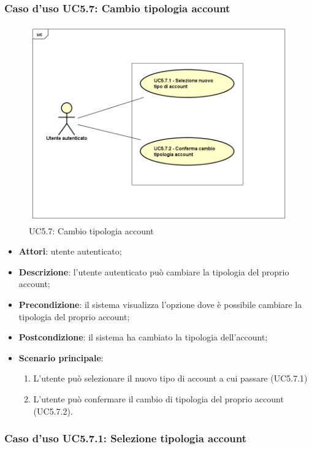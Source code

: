 \subsubsection{Caso d'uso UC5.7: Cambio tipologia account}
\label{UC5.7}
\begin{figure}[h]
	\centering
	\includegraphics[scale=0.5,keepaspectratio]{UML/UC5_7.png}
	\caption{UC5.7: Cambio tipologia account}
\end{figure}

\begin{itemize}
	\item \textbf{Attori}: utente autenticato;
	\item \textbf{Descrizione}: l'utente autenticato può cambiare la tipologia del proprio account; 
	\item \textbf{Precondizione}: il sistema visualizza l'opzione dove è possibile cambiare la tipologia del proprio account;
	\item \textbf{Postcondizione}: il sistema ha cambiato la tipologia dell'account;
	\item \textbf{Scenario principale}:
	\begin{enumerate}
		\item L'utente può selezionare il nuovo tipo di account a cui passare (UC5.7.1)
		\item L'utente può confermare il cambio di tipologia del proprio account (UC5.7.2).
	\end{enumerate}
\end{itemize}

\subsubsection{Caso d'uso UC5.7.1: Selezione tipologia account}

